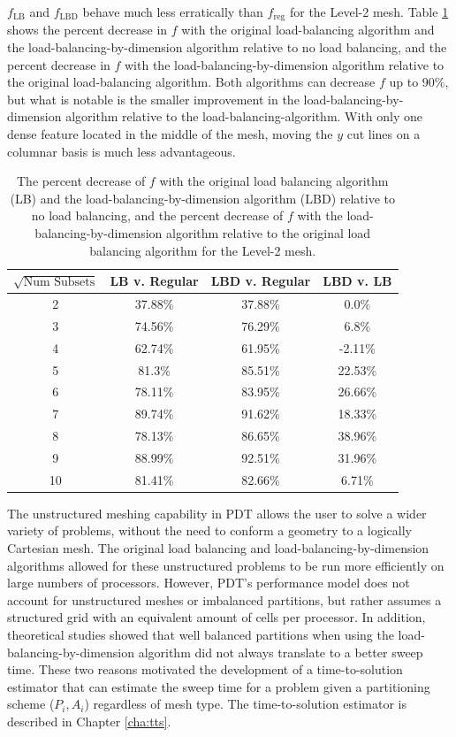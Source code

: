 \documentclass[times,final]{elsarticle}
\begin{document}
$f_\text{LB}$ and $f_\text{LBD}$ behave much less erratically than $f_\text{reg}$ for the Level-2 mesh.
Table \ref{level2_metric_improvement} shows the percent decrease in $f$ with the original load-balancing algorithm and the load-balancing-by-dimension algorithm relative to no load balancing, and the percent decrease in $f$ with the load-balancing-by-dimension algorithm relative to the original load-balancing algorithm.
Both algorithms can decrease $f$ up to 90\%, but what is notable is the smaller improvement in the load-balancing-by-dimension algorithm relative to the load-balancing-algorithm.
With only one dense feature located in the middle of the mesh, moving the $y$ cut lines on a columnar basis is much less advantageous.
\begin{table}[ht]
\centering
\caption{The percent decrease of $f$ with the original load balancing algorithm (LB) and the load-balancing-by-dimension algorithm (LBD) relative to no load balancing, and the percent decrease of $f$ with the load-balancing-by-dimension algorithm relative to the original load balancing algorithm for the Level-2 mesh.}
\label{level2_metric_improvement}
\begin{tabular}{c|c|c|c}
\textbf{$\sqrt{\text{Num Subsets}}$} & \bf LB v. Regular  & \bf LBD v. Regular & \bf LBD v. LB \\ \hline
2&37.88\%&37.88\%&0.0\%\\ \hline
3&74.56\%&76.29\%&6.8\%\\ \hline
4&62.74\%&61.95\%&-2.11\%\\ \hline
5&81.3\%&85.51\%&22.53\%\\ \hline
6&78.11\%&83.95\%&26.66\%\\ \hline
7&89.74\%&91.62\%&18.33\%\\ \hline
8&78.13\%&86.65\%&38.96\%\\ \hline
9&88.99\%&92.51\%&31.96\%\\ \hline
10&81.41\%&82.66\%&6.71\%
\end{tabular}
\end{table}

\FloatBarrier
The unstructured meshing capability in PDT allows the user to solve a wider variety of problems, without the need to conform a geometry to a logically Cartesian mesh.
The original load balancing and load-balancing-by-dimension algorithms allowed for these unstructured problems to be run more efficiently on large numbers of processors.
However, PDT's performance model does not account for unstructured meshes or imbalanced partitions, but rather assumes a structured grid with an equivalent amount of cells per processor.
In addition, theoretical studies showed that well balanced partitions when using the load-balancing-by-dimension algorithm did not always translate to a better sweep time.
These two reasons motivated the development of a time-to-solution estimator that can estimate the sweep time for a problem given a partitioning scheme ($P_i, A_i$) regardless of mesh type. The time-to-solution estimator is described in Chapter \ref{cha:tts}.
\end{document}
